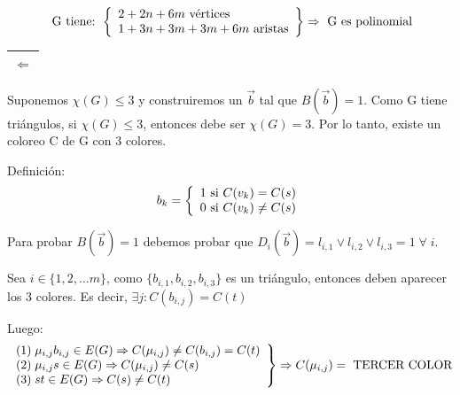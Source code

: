 \documentclass[12pt,a4paper]{report}
\newcounter{neq}
\begin{document}
  				\begin{equation*}
  					\textup{ G tiene: }
  	  				\left \lbrace
  			  		\begin{array}{l}
  	    				2 + 2n + 6m \textup{ vértices} \\
  	    				1 + 3n + 3m+ 3m + 6m \textup{ aristas}
  			  		\end{array}
  	  				\right\rbrace
  						\Rightarrow \textup{ G es polinomial}
  				\end{equation*}

  			\begin{tabular}{|c|} \hline $\Leftarrow$ \\\hline \end{tabular}
  				\par Suponemos $\chi(G) \leq 3$ y construiremos un $\overrightarrow{b}$ tal que $B(\overrightarrow{b}) = 1$. Como G tiene triángulos, si $\chi (G) \leq 3$, entonces debe ser $\chi (G) = 3$. Por lo tanto, existe un coloreo C de G con 3 colores.
  				\vspace{3mm}
  				\par Definición:
  				\begin{equation*}
  					b_{k} =
  		  		\left \lbrace
  		  		\begin{array}{l}
  		    		1 \textup{ si } C(v_{k}) = C(s) \\
  		    		0 \textup{ si } C(v_{k}) \neq C(s)
  		  		\end{array}
  		  		\right.
  				\end{equation*}
  				\par Para probar $B(\overrightarrow{b}) = 1$ debemos probar que $D_{i}(\overrightarrow{b}) = l_{i, 1} \vee l_{i, 2} \vee l_{i, 3} = 1 \; \forall \; i$.
  				\par Sea $i \in \lbrace	1, 2, \dotsc m \rbrace$, como $ \lbrace b_{i, 1}, b_{i, 2}, b_{i, 3} \rbrace$ es un triángulo, entonces deben aparecer los 3 colores. Es decir, $\exists j : C(b_{i, j}) = C(t)$
  				\vspace{3mm}
  				\par Luego:
  				\begin{equation*}
  		  		\left.
  		  		\begin{array}{l}
  		    		(1) \; \mu_{i, j} b_{i, j} \in E(G) \Rightarrow C(\mu_{i, j}) \neq C(b_{i, j}) = C(t) \\
  		    		(2) \; \mu_{i, j} s \in E(G) \Rightarrow C(\mu_{i, j}) \neq C(s) \\
  		    		(3) \; s t \in E(G) \Rightarrow C(s) \neq C(t)
  		  		\end{array}
  		 			\right\rbrace
  		 			\Rightarrow C(\mu_{i, j}) = \textup{ TERCER COLOR}
  				\end{equation*}
\end{document}
